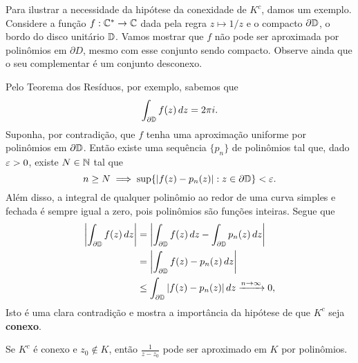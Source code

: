     Para ilustrar a necessidade da hipótese da conexidade de $K^c$, damos um exemplo. 
    Considere a função $f: \mathbb{C}^* \to \mathbb{C}$ dada pela regra $z \mapsto 1/z$ e o compacto 
    $\partial \mathbb{D}$, o bordo do disco unitário  $\mathbb{D}$. Vamos mostrar que $f$ não
    pode ser aproximada por polinômios em $\partial D$, mesmo com esse conjunto sendo compacto.
    Observe ainda que o seu complementar é um conjunto desconexo.
    
    Pelo Teorema dos Resíduos, por exemplo, sabemos que
    \begin{equation*}
        \int_{\partial \mathbb{D}}f(z) \, dz = 2 \pi i.
    \end{equation*}
    Suponha, por contradição, que $f$ tenha uma aproximação uniforme por polinômios em 
    $\partial \mathbb{D}$. Então existe uma sequência $\{p_n\}$ de polinômios tal que, 
    dado $\varepsilon > 0$, existe $N \in \mathbb{N}$ tal que
    \begin{equation*}
        n \geq N \implies \sup \{|f(z) - p_n(z)|: z \in \partial \mathbb{D}\} < \varepsilon.
    \end{equation*}
    Além disso, a integral de qualquer polinômio ao redor de uma curva simples e fechada é sempre
    igual a zero, pois polinômios são funções inteiras. Segue que
    \begin{align*}
        \left|\int_{\partial \mathbb{D}} f(z) \, dz\right| 
        &= \left|\int_{\partial \mathbb{D}} f(z) \, dz - \int_{\partial \mathbb{D}} p_n(z) \, dz\right| \\
        &= \left|\int_{\partial \mathbb{D}} f(z) - p_n(z)\, dz\right| \\
        &\leq \int_{\partial \mathbb{D}}|f(z) - p_n(z)| \, dz \xrightarrow{n\to\infty} 0,
    \end{align*}
    Isto é uma clara contradição e mostra a importância da hipótese de que $K^c$ seja {\bf conexo}.
    \begin{lema}
    \label{LR3}
        Se $K^c$ é conexo e $z_0 \not \in K$, então $\displaystyle{\frac{1}{z-z_0}}$ 
        pode ser aproximado em $K$ por polinômios.
    \end{lema}
